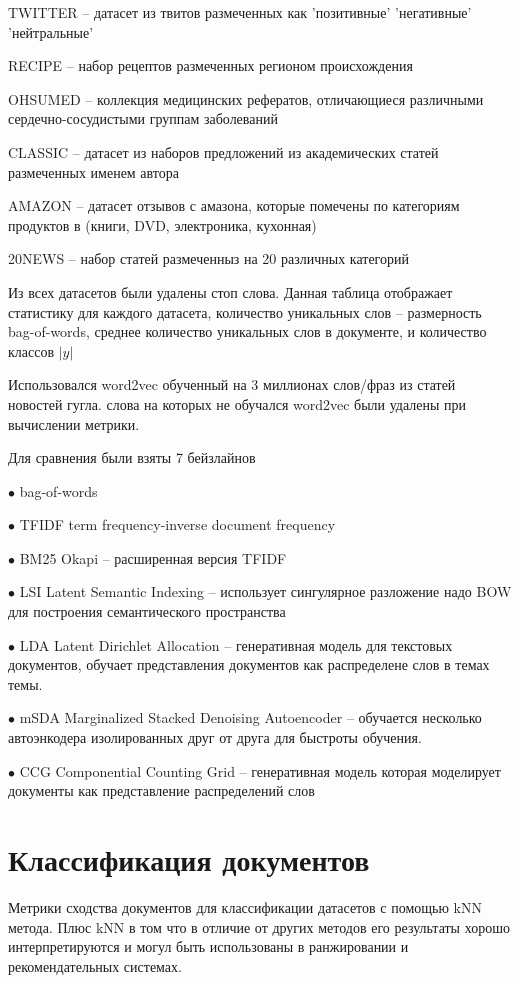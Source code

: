 \documentclass[10pt,reqno]{amsart}
\theoremstyle{definition}
\theoremstyle{remark}
\begin{document}
TWITTER -- датасет из твитов размеченных как 'позитивные' 'негативные' 'нейтральные'


RECIPE -- набор рецептов размеченных регионом происхождения


OHSUMED -- коллекция медицинских рефератов, отличающиеся различными сердечно-сосудистыми группам заболеваний


CLASSIC -- датасет из наборов предложений из академических статей размеченных именем автора


AMAZON -- датасет отзывов с амазона, которые помечены по категориям продуктов в (книги, DVD, электроника, кухонная)


20NEWS -- набор статей размеченныз на 20 различных категорий


Из всех датасетов были удалены стоп слова. Данная таблица отображает статистику для каждого датасета, количество уникальных слов -- размерность  bag-of-words, среднее количество уникальных слов в документе, и количество классов $|y|$


Использовался  word2vec обученный на 3 миллионах слов/фраз из статей новостей гугла. слова на которых не обучался word2vec были удалены при вычислении метрики.

Для сравнения были взяты 7 бейзлайнов


$\bullet$ bag-of-words


$\bullet$ TFIDF term frequency-inverse document frequency


$\bullet$ BM25 Okapi -- расширенная версия TFIDF


$\bullet$ LSI Latent Semantic Indexing  -- использует сингулярное разложение надо BOW для построения семантического пространства


$\bullet$ LDA Latent Dirichlet Allocation -- генеративная модель для текстовых документов, обучает представления документов как распределене слов в темах темы.


$\bullet$ mSDA Marginalized Stacked Denoising Autoencoder -- обучается несколько автоэнкодера изолированных друг от друга для быстроты обучения.


$\bullet$ CCG Componential Counting Grid -- генеративная модель которая моделирует документы как представление распределений слов


\section{Классификация документов}

Метрики сходства документов для классификации датасетов с помощью kNN метода. Плюс kNN в том что в отличие от других методов его результаты хорошо интерпретируются и могул быть использованы в ранжировании и рекомендательных системах.
\end{document}
